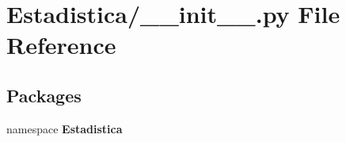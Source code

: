 \section{\-Estadistica/\-\_\-\-\_\-init\-\_\-\-\_\-.py \-File \-Reference}
\label{_estadistica_2____init_____8py}
\subsection*{\-Packages}
\begin{DoxyCompactItemize}
\item 
namespace {\bf \-Estadistica}
\end{DoxyCompactItemize}
